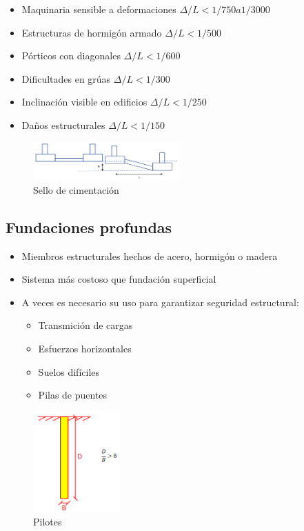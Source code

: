 \newpage
\begin{itemize}
    \item Maquinaria sensible a deformaciones $\Delta /L < 1/750 a 1/3000$
    \item Estructuras de hormigón armado $\Delta /L < 1/500$
    \item Pórticos con diagonales $\Delta /L < 1/600$
    \item Dificultades en grúas $\Delta /L < 1/300$
    \item Inclinación visible en edificios $\Delta /L < 1/250$
    \item Daños estructurales $\Delta /L < 1/150$
\end{itemize}

\begin{figure}[h]
    \centering
    \includegraphics[width=0.5\textwidth]{FOTOS/sello_cimentacion2.png}
    \caption{Sello de cimentación}
    \label{fig:9_2}
\end{figure}

\subsection{Fundaciones profundas}
\begin{itemize}
    \item Miembros estructurales hechos de acero, hormigón o madera
    \item Sistema más costoso que fundación superficial
    \item A veces es necesario su uso para garantizar seguridad estructural:
    \begin{itemize}
        \item Transmición de cargas
        \item Esfuerzos horizontales
        \item Suelos difíciles
        \item Pilas de puentes
    \end{itemize}
\end{itemize}

\begin{figure}[h]
    \centering
    \includegraphics[width=0.3\textwidth]{FOTOS/pilotes.png}
    \caption{Pilotes}
    \label{fig:9_3}
\end{figure}

